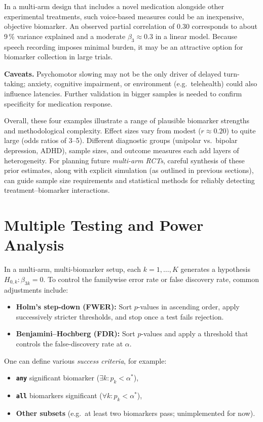 \documentclass[11pt]{article}
\begin{document}
In a multi-arm design that includes a novel medication alongside other experimental treatments, such voice-based measures could be an inexpensive, objective biomarker. An observed partial correlation of 0.30 corresponds to about 9\,\% variance explained and a moderate $\beta_{3}\approx 0.3$ in a linear model. Because speech recording imposes minimal burden, it may be an attractive option for biomarker collection in large trials.

\vspace{1ex}
\noindent
\textbf{Caveats.}
Psychomotor slowing may not be the only driver of delayed turn-taking; anxiety, cognitive impairment, or environment (e.g.\ telehealth) could also influence latencies. Further validation in bigger samples is needed to confirm specificity for medication response. 

\bigskip

Overall, these four examples illustrate a range of plausible biomarker strengths and methodological complexity. Effect sizes vary from modest ($r\approx 0.20$) to quite large (odds ratios of 3--5). Different diagnostic groups (unipolar vs.\ bipolar depression, ADHD), sample sizes, and outcome measures each add layers of heterogeneity. For planning future \emph{multi-arm RCTs}, careful synthesis of these prior estimates, along with explicit simulation (as outlined in previous sections), can guide sample size requirements and statistical methods for reliably detecting treatment--biomarker interactions.

\pagebreak
\section{Multiple Testing and Power Analysis}

In a multi-arm, multi-biomarker setup, each $k=1,\ldots,K$ generates a hypothesis $H_{0,k}:\beta_{3k}=0$. To control the familywise error rate or false discovery rate, common adjustments include:

\begin{itemize}
\item \textbf{Holm's step-down (FWER):} Sort $p$-values in ascending order, apply successively stricter thresholds, and stop once a test fails rejection.
\item \textbf{Benjamini--Hochberg (FDR):} Sort $p$-values and apply a threshold that controls the false-discovery rate at $\alpha$.
\end{itemize}

One can define various \emph{success criteria}, for example:
\begin{itemize}
  \item \textbf{\texttt{any}} significant biomarker ($\exists k: p_k < \alpha^*$),
  \item \textbf{\texttt{all}} biomarkers significant ($\forall k: p_k < \alpha^*$),
  \item \textbf{Other subsets} (e.g.\ at least two biomarkers pass; unimplemented for now).
\end{itemize}
\end{document}
